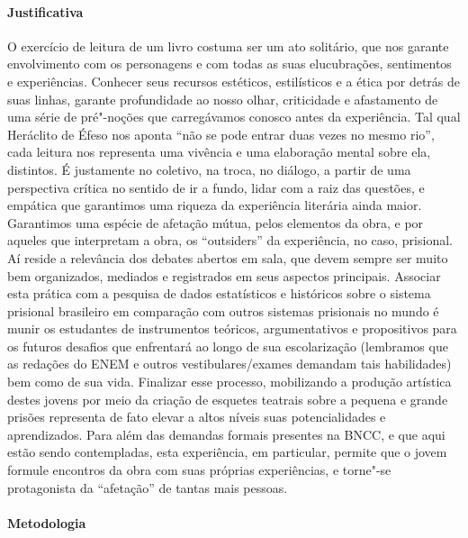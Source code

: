 \documentclass[11pt]{extarticle}
\begin{document}
\paragraph{Justificativa} O exercício de leitura de um livro costuma ser
um ato solitário, que nos garante envolvimento com os personagens e com
todas as suas elucubrações, sentimentos e experiências. Conhecer seus
recursos estéticos, estilísticos e a ética por detrás de suas linhas,
garante profundidade ao nosso olhar, criticidade e afastamento de uma
série de pré"-noções que carregávamos conosco antes da experiência. Tal
qual Heráclito de Éfeso nos aponta ``não se pode entrar duas vezes no
mesmo rio'', cada leitura nos representa uma vivência e uma elaboração
mental sobre ela, distintos. É justamente no coletivo, na troca, no
diálogo, a partir de uma perspectiva crítica no sentido de ir a fundo,
lidar com a raiz das questões, e empática que garantimos uma riqueza da
experiência literária ainda maior. Garantimos uma espécie de afetação
mútua, pelos elementos da obra, e por aqueles que interpretam a obra, os
``outsiders'' da experiência, no caso, prisional. Aí reside a relevância
dos debates abertos em sala, que devem sempre ser muito bem organizados,
mediados e registrados em seus aspectos principais. Associar esta
prática com a pesquisa de dados estatísticos e históricos sobre o
sistema prisional brasileiro em comparação com outros sistemas
prisionais no mundo é munir os estudantes de instrumentos teóricos,
argumentativos e propositivos para os futuros desafios que enfrentará ao
longo de sua escolarização (lembramos que as redações do ENEM e outros
vestibulares/exames demandam tais habilidades) bem como de sua vida.
Finalizar esse processo, mobilizando a produção artística destes jovens
por meio da criação de esquetes teatrais sobre a pequena e grande
prisões representa de fato elevar a altos níveis suas potencialidades e
aprendizados. Para além das demandas formais presentes na BNCC, e que
aqui estão sendo contempladas, esta experiência, em particular, permite
que o jovem formule encontros da obra com suas próprias experiências, e
torne"-se protagonista da ``afetação'' de tantas mais pessoas.


\paragraph{Metodologia} 
\end{document}

